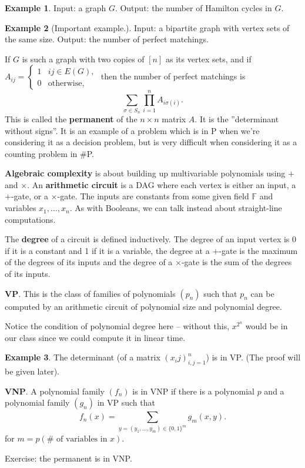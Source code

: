 \documentclass{article}
\theoremstyle{definition}
\newtheorem{example}{Example}[section]
\begin{document}
\begin{example}
    Input: a graph $G$. Output: the number of Hamilton cycles in $G$.
\end{example}
\begin{example}[Important example.]
    Input: a bipartite graph with vertex sets of the same size. Output: the number of perfect matchings.
    \vspace{1mm}
     
    If $G$ is such a graph with two copies of $[n]$ as its vertex sets, and if $A_{ij} = \begin{cases}
        1& ij \in E(G),\\
        0& \text{otherwise},
    \end{cases}$
    then the number of perfect matchings is \[
    \sum_{\sigma \in S_n}^{} \prod_{i=1}^{n} A_{i \sigma(i)}. 
    \]
    This is called the \textbf{permanent} of the $n \times n$ matrix $A$. It is the ''determinant without signs''. It is an example of a problem which is in P when we're considering it as a decision problem, but is very difficult when considering it as a counting problem in \#P.
\end{example}
\vspace{1mm}
 
\textbf{Algebraic complexity} is about building up multivariable polynomials using $+$ and $\times$. An \textbf{arithmetic circuit} is a DAG where each vertex is either an input, a $+$-gate, or a $\times$-gate. The inputs are constants from some given field $\mathbb{F}$ and variables $x_1,\ldots,x_n$. As with Booleans, we can talk instead about straight-line computations.
\vspace{1mm}
 
The \textbf{degree} of a circuit is defined inductively. The degree of an input vertex is 0 if it is a constant and 1 if it is a variable, the degree at a $+$-gate is the maximum of the degrees of its inputs and the degree of a $\times$-gate is the sum of the degrees of its inputs. 

\vspace{1mm}
 
\textbf{VP}. This is the class of families of polynomials $(p_n)$ such that $p_n$ can be computed by an arithmetic circuit of polynomial size and polynomial degree.
\vspace{1mm}
 
Notice the condition of polynomial degree here -- without this, $x^{2^n}$ would be in our class since we could compute it in linear time.
\begin{example}
    The determinant (of a matrix $(x_ij)_{i,j=1}^n$) is in VP. (The proof will be given later).
\end{example}
\vspace{1mm}
 
\textbf{VNP}. A polynomial family $(f_n)$ is in VNP if there is a polynomial $p$ and a polynomial family $(g_n)$ in VP such that \[
f_n(x) = \sum_{y = (y_1,\ldots,y_m) \in \{0,1\}^m}^{} g_m(x,y). 
\]
for $m = p(\# \text{ of variables in }x)$.
\vspace{1mm}
 
Exercise: the permanent is in VNP.
\end{document}
